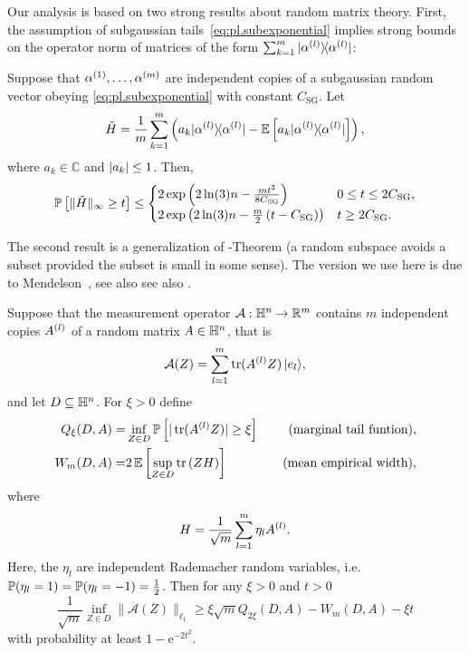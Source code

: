 Our analysis is based on two strong results about random matrix theory.
First, the assumption of subgaussian tails~\eqref{eq:pl.subexponential} implies strong bounds on the operator norm of matrices of the form $\sum_{k=1}^m \ketbra{\alpha\ind{l}}$:

\begin{theorem}%
  \label{thm:bernstein}
  Suppose that $\alpha^{(1)},\ldots,\alpha^{(m)}$ are independent copies of a subgaussian random vector obeying \cref{eq:pl.subexponential} with constant $C_\mathrm{SG}$.
  Let
  \[
    \tilde{ H} = \frac{1}{m} \sum_{k=1}^m \left( a_k \ketbra{\alpha\ind{l}} - \mathbb{E} \left[ a_k \ketbra{\alpha\ind{l}} \right] \right),
    \label{eq:pl.Htilde}
  \]
  where $a_k \in \mathbb{C}$ and ${\vert a_k\vert} \leq 1$.
  Then,
  \begin{align}
    \mathbb{P} \left[ \| \tilde{ H} \|_\infty \geq t \right]
    \leq
    \begin{cases}
      2 \exp \left( 2 \ln (3) n  - \frac{mt^2}{8 C_\mathrm{SG}} \right) & 0 \leq t \leq 2C_\mathrm{SG}, \\
      2 \exp \left( 2 \ln (3) n - \frac{m}{2} \left( t - C_\mathrm{SG} \right)  \right) & t \geq 2 C_\mathrm{SG}.
    \end{cases}
  \end{align}
\end{theorem}


The second result is a generalization of -Theorem \cite{Gordon_1988_On} (a random subspace avoids a subset provided the subset is small in some sense).
The version we use here is due to Mendelson~\cite{Mendelson_2015_Learning,Koltchinskii_2015_Bounding}, see also see also \cite{Tropp_2014_Convex}.

\begin{theorem}%
  \label{thm:mendelson}
  Suppose that the measurement operator $\mathcal{A}:\mathbb{H}^n \to \mathbb{R}^m$ contains $m$ independent copies $A^{(l)}$ of a random matrix $ A \in \mathbb{H}^n$, that is
  \[
    \label{eq:pl.measurement_operator_definition}
    \mathcal{A}(Z) = \sum_{l=1}^m \tr (A\ind{l}  Z) \,  \ket{e_l},
  \]
  and let $D \subseteq \mathbb{H}^n$.
  For $\xi >0$ define
  \begin{align}
    Q_\xi (D,  A) =& \inf_{ Z \in D}\mathbb{P} \left[ | \operatorname{tr} (A^{(l)}  Z) | \geq \xi \right] \quad &\textrm{(marginal tail funtion)}, \label{eq:pl.marginal_tail_function}\\
    W_m (D,  A) =& 2 \, \mathbb{E} \left[ \sup_{ Z \in D} \operatorname{tr} \left(  Z  H \right) \right] \quad &\textrm{(mean empirical width)},
  \end{align}
  where
  \[
    H= \frac{1}{\sqrt{m}} \sum_{l=1}^m \eta_l A^{(l)}.
  \]
  Here, the $\eta_l$ are independent Rademacher random variables, i.e.\ $\mathbb{P}(\eta_l = 1) = \mathbb{P}(\eta_l=-1) = \frac{1}{2}$.
  Then for any $\xi >0$ and $t >0$
  \[
    \frac{1}{\sqrt{m}}\inf_{ Z \in D} \| \mathcal{A}( Z) \|_{\ell_1} \geq \xi \sqrt{m} Q_{2\xi}(D,  A) -  W_m (D,  A)-\xi t \label{eq:pl.mendelson}
  \]
  with probability at least $1-\mathrm{e}^{-2t^2}$.
\end{theorem}

